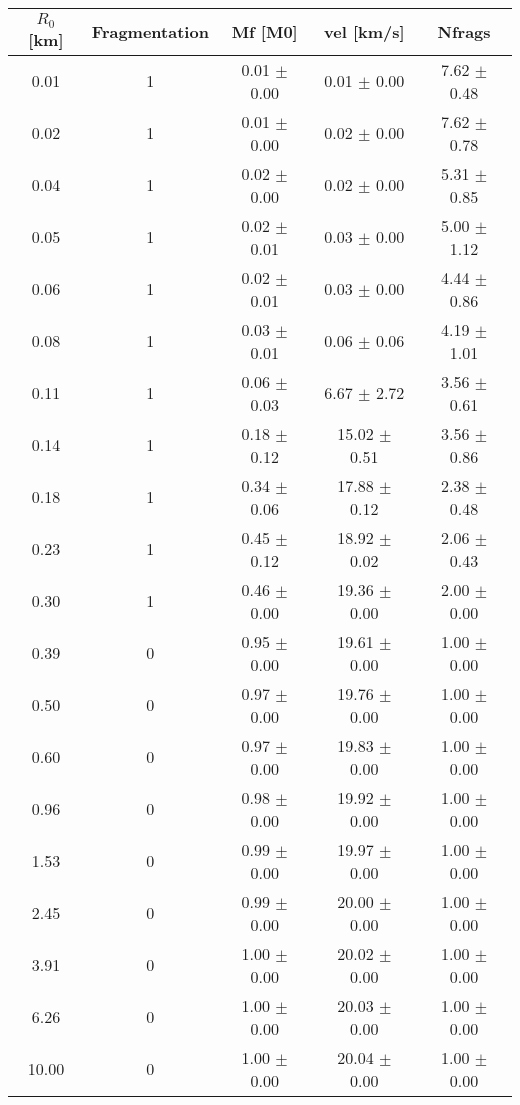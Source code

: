 \begin{tabular}{|c||c||c||c||c|}
\toprule
$R_0$ [km] & Fragmentation & Mf [M0] & vel [km/s] & Nfrags \\
\midrule
0.01 & 1 & 0.01 $\pm$ 0.00 & 0.01 $\pm$ 0.00 & 7.62 $\pm$ 0.48 \\
0.02 & 1 & 0.01 $\pm$ 0.00 & 0.02 $\pm$ 0.00 & 7.62 $\pm$ 0.78 \\
0.04 & 1 & 0.02 $\pm$ 0.00 & 0.02 $\pm$ 0.00 & 5.31 $\pm$ 0.85 \\
0.05 & 1 & 0.02 $\pm$ 0.01 & 0.03 $\pm$ 0.00 & 5.00 $\pm$ 1.12 \\
0.06 & 1 & 0.02 $\pm$ 0.01 & 0.03 $\pm$ 0.00 & 4.44 $\pm$ 0.86 \\
0.08 & 1 & 0.03 $\pm$ 0.01 & 0.06 $\pm$ 0.06 & 4.19 $\pm$ 1.01 \\
0.11 & 1 & 0.06 $\pm$ 0.03 & 6.67 $\pm$ 2.72 & 3.56 $\pm$ 0.61 \\
0.14 & 1 & 0.18 $\pm$ 0.12 & 15.02 $\pm$ 0.51 & 3.56 $\pm$ 0.86 \\
0.18 & 1 & 0.34 $\pm$ 0.06 & 17.88 $\pm$ 0.12 & 2.38 $\pm$ 0.48 \\
0.23 & 1 & 0.45 $\pm$ 0.12 & 18.92 $\pm$ 0.02 & 2.06 $\pm$ 0.43 \\
0.30 & 1 & 0.46 $\pm$ 0.00 & 19.36 $\pm$ 0.00 & 2.00 $\pm$ 0.00 \\
0.39 & 0 & 0.95 $\pm$ 0.00 & 19.61 $\pm$ 0.00 & 1.00 $\pm$ 0.00 \\
0.50 & 0 & 0.97 $\pm$ 0.00 & 19.76 $\pm$ 0.00 & 1.00 $\pm$ 0.00 \\
0.60 & 0 & 0.97 $\pm$ 0.00 & 19.83 $\pm$ 0.00 & 1.00 $\pm$ 0.00 \\
0.96 & 0 & 0.98 $\pm$ 0.00 & 19.92 $\pm$ 0.00 & 1.00 $\pm$ 0.00 \\
1.53 & 0 & 0.99 $\pm$ 0.00 & 19.97 $\pm$ 0.00 & 1.00 $\pm$ 0.00 \\
2.45 & 0 & 0.99 $\pm$ 0.00 & 20.00 $\pm$ 0.00 & 1.00 $\pm$ 0.00 \\
3.91 & 0 & 1.00 $\pm$ 0.00 & 20.02 $\pm$ 0.00 & 1.00 $\pm$ 0.00 \\
6.26 & 0 & 1.00 $\pm$ 0.00 & 20.03 $\pm$ 0.00 & 1.00 $\pm$ 0.00 \\
10.00 & 0 & 1.00 $\pm$ 0.00 & 20.04 $\pm$ 0.00 & 1.00 $\pm$ 0.00 \\
\bottomrule
\end{tabular}
